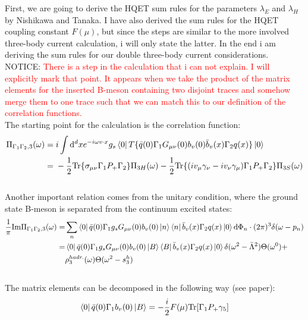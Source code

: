 \documentclass[openright,twoside,12pt,a4paper,final]{article}
\begin{document}
	\noindent 
	First, we are going to derive the HQET sum rules for the parameters $\lambda_E$ and $\lambda_H$ by Nishikawa and Tanaka. I have also derived the sum rules for the HQET coupling constant $F(\mu)$, but since the steps are similar to the more involved three-body current calculation, i will only state the latter. In the end i am deriving the sum rules for our double three-body current considerations. \\
	NOTICE: \textcolor{red}{There is a step in the calculation that i can not explain. I will explicitly mark that point. It appears when we take the product of the matrix elements for the inserted B-meson containing two disjoint traces and somehow merge them to one trace such that we can match this to our definition of the correlation functions.} \\
	The starting point for the calculation is the correlation function: \\
	\begin{align}
		\Pi_{\Gamma_1 \Gamma_2,3}(\omega) =& \; i \int \mathrm{d}^d x e^{-i \omega v \cdot x} g_s \bra{0} T\{\bar{q}(0) \Gamma_1 G_{\mu \nu}(0) b_v(0) \bar{b}_v(x) \Gamma_2 q(x)\} \ket{0}  \nonumber \\ =& \; - \frac{1}{2} \mathrm{Tr} \{\sigma_{\mu \nu} \Gamma_1 P_+  \Gamma_2\} \Pi_{3H}(\omega) - \frac{1}{2} \mathrm{Tr} \{(i v_{\mu} \gamma_{\nu} - i v_{\nu} \gamma_{\mu}) \Gamma_1 P_+  \Gamma_2\} \Pi_{3S}(\omega)
	\end{align} \\
	Another important relation comes from the unitary condition, where the ground state B-meson is separated from the continuum excited states: \\
	\begin{align}
		\frac{1}{\pi} \mathrm{Im} \Pi_{\Gamma_1 \Gamma_2,3}(\omega) =& \sum_n \bra{0} \bar{q}(0) \Gamma_1 g_s G_{\mu \nu}(0) b_v(0)\ket{n} \bra{n} \bar{b}_v(x) \Gamma_2 q(x) \ket{0} \mathrm{d} \Phi_n \cdot (2\pi)^3 \delta(\omega - p_n) \nonumber \\ =& \bra{0} \bar{q}(0) \Gamma_1 g_s G_{\mu \nu}(0) b_v(0)\ket{B} \bra{B} \bar{b}_v(x) \Gamma_2 q(x) \ket{0} \delta(\omega^2 - \bar{\Lambda}^2) \Theta(\omega^0) + \nonumber \\& \rho_3^{hadr.}(\omega) \Theta(\omega^2 - s_3^h)
	\end{align} \\
	The matrix elements can be decomposed in the following way (see paper):
	\begin{align}
		\bra{0} \bar{q}(0) \Gamma_1 b_v(0) \ket{B} = -\frac{i}{2} F(\mu) \mathrm{Tr}[\Gamma_1 P_+ \gamma_5] \label{MatrixEF}
	\end{align}
\end{document}
